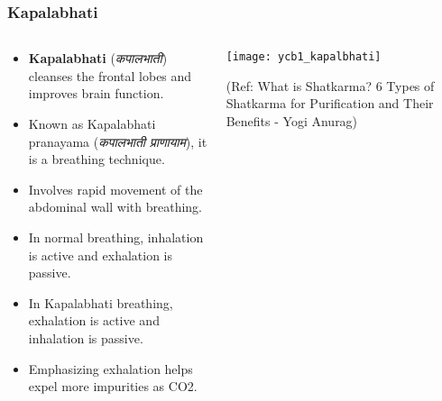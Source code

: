 \begin{frame}[fragile]\frametitle{Kapalabhati}
\begin{columns}
    \begin{column}[T]{0.5\linewidth}
      \begin{itemize}
          \item \textbf{Kapalabhati} (\textit{कपालभाती}) cleanses the frontal lobes and improves brain function.
          \item Known as Kapalabhati pranayama (\textit{कपालभाती प्राणायाम}), it is a breathing technique.
          \item Involves rapid movement of the abdominal wall with breathing.
          \item In normal breathing, inhalation is active and exhalation is passive.
          \item In Kapalabhati breathing, exhalation is active and inhalation is passive.
          \item Emphasizing exhalation helps expel more impurities as CO2.
      \end{itemize}
    \end{column}
    \begin{column}[T]{0.5\linewidth}
        \begin{center}
        \texttt{[image: ycb1\_kapalbhati]}
		
		{\tiny (Ref: What is Shatkarma? 6 Types of Shatkarma for Purification and Their Benefits - Yogi Anurag)}	
        \end{center}	
    \end{column}
\end{columns}
\end{frame}


